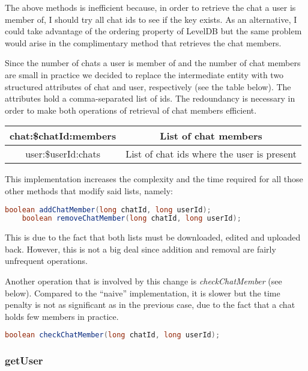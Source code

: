 \documentclass[10pt]{article}
\begin{document}
The above methods is inefficient because, in order to retrieve the chat a user 
is member of, I should try all chat ids to see if the key exists. As an alternative, 
I could take advantage of the ordering property of LevelDB but the same problem 
would arise in the complimentary method that retrieves the chat members.

Since the number of chats a user is member of and the number of chat members 
are small in practice we decided to replace the intermediate entity with two 
structured attributes of chat and user, respectively (see the table below). 
The attributes hold a 
comma-separated list of ids. The redoundancy is necessary in order to make 
both operations of retrieval of chat members efficient. 

\begin{center}
    \begin{tabular}{ | c | c | }
        \hline
        chat:\$chatId:members & List of chat members \\\hline
        user:\$userId:chats & List of chat ids where the user is present \\\hline
    \end{tabular}
\end{center}

This implementation increases the complexity and the time required for all those
other methods that modify said lists, namely:
\begin{lstlisting}[language = Java]
    boolean addChatMember(long chatId, long userId);
    boolean removeChatMember(long chatId, long userId);
\end{lstlisting}

This is due to the fact that both lists must be downloaded, edited and uploaded back.
However, this is not a big deal since addition and removal are fairly unfrequent 
operations.

Another operation that is involved by this change is \textit{checkChatMember} (see 
below). Compared to the ``naive'' implementation, it is slower but the time penalty
is not as significant as in the previous case, due to the fact that a chat holds 
few members in practice.

\begin{lstlisting}[language = Java]
    boolean checkChatMember(long chatId, long userId);
\end{lstlisting}

\subsubsection{getUser}
\end{document}
